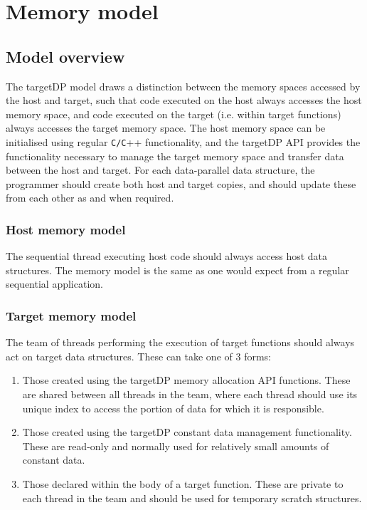 \chapter{Memory model}

\section{Model overview}
The targetDP model draws a distinction between the memory spaces
accessed by the host and target, such that code executed on the host
always accesses the host memory space, and code executed on the target
(i.e. within target functions) always accesses the target memory space. The
host memory space can be initialised using regular \verb+C/C+++
functionality, and the targetDP API provides the functionality
necessary to manage the target memory space and transfer data between
the host and target. For each data-parallel data structure, the
programmer should create both host and target copies, and should
update these from each other as and when required.

\subsection{Host memory model}
The sequential thread executing host code should always access host data
structures. The memory model is the same as one would expect from a
regular sequential application.

\subsection{Target memory model}
The team of threads performing the execution of target functions
should always act on target data structures. These can take one of 3
forms:
\begin{enumerate}
\item Those created using the targetDP memory allocation API
  functions. These are shared between all threads in the team, where
  each thread should use its unique index to access the portion of data
  for which it is responsible.
\item Those created using the targetDP constant data management
  functionality. These are read-only and normally used for relatively
  small amounts of constant data.
\item Those declared within the body of a target function. These are private
  to each thread in the team and should be used for temporary scratch structures.
\end{enumerate}

